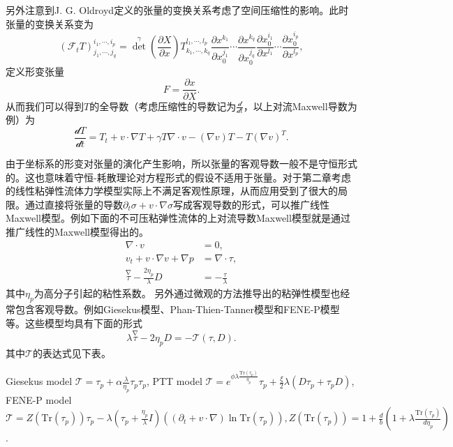 \documentclass{article}
\begin{document}
另外注意到J. G. Oldroyd定义的张量的变换关系考虑了空间压缩性的影响。此时张量的变换关系变为
\begin{equation*}
	(\mathcal{F}_t T)^{i_1,\cdots,i_p}_{j_1, \cdots,j_q} = {\det}^\gamma({\frac{\partial X}{\partial x}}) T^{l_1,\cdots,l_p}_{k_1, \cdots,k_q} \frac{\partial x^{k_1}}{\partial x_0^{j_1}} \cdots \frac{\partial x^{k_q}}{\partial x_0^{j_q}} \frac{\partial x_0^{i_1}}{\partial x^{l_1}} \cdots \frac{\partial x_0^{i_p}}{\partial x^{l_p}},  
\end{equation*}
定义形变张量
\begin{equation*}
	F = \frac{\partial x}{\partial X}.
\end{equation*}
从而我们可以得到$T$的全导数（考虑压缩性的导数记为$\frac{\mathcal{d}}{\mathcal{d} t}$，以上对流Maxwell导数为例）为
\begin{equation*}
	\frac{\mathcal{d} T}{\mathcal{d} t} =  T_t +v \cdot \nabla T + \gamma T \nabla \cdot v - (\nabla v) T - T(\nabla v)^T.   
\end{equation*}

由于坐标系的形变对张量的演化产生影响，所以张量的客观导数一般不是守恒形式的。这也意味着守恒-耗散理论对方程形式的假设不适用于张量。对于第二章考虑的线性粘弹性流体力学模型实际上不满足客观性原理，从而应用受到了很大的局限。通过直接将张量的导数$\partial_t \sigma  + v \cdot \nabla \sigma$写成客观导数的形式，可以推广线性Maxwell模型。例如下面的不可压粘弹性流体的上对流导数Maxwell模型就是通过推广线性的Maxwell模型得出的\cite{}。
\begin{subequations} \label{eq:UCM}
	\begin{align}
		\nabla \cdot v &= 0, \\
		v_t + v \cdot \nabla v + \nabla p  &= \nabla \cdot \tau, \\
		\stackrel{\nabla} \tau - \frac{2\eta_p}{\lambda} D &= - \frac{\tau}{\lambda}
	\end{align}
\end{subequations}
其中$\eta_p$为高分子引起的粘性系数。
另外通过微观的方法推导出的粘弹性模型也经常包含客观导数。例如Giesekus模型、Phan-Thien-Tanner模型和FENE-P模型等。这些模型均具有下面的形式
\begin{equation*}
	\lambda \stackrel{\nabla} \tau  -2 \eta_p D = - \mathcal{T}(\tau,D).
\end{equation*}
其中$\mathcal{T}$的表达式见下表\cite{}。

Giesekus model $\mathcal{T} = \tau_p + \alpha \frac{\lambda}{\eta_p} \tau_p\tau_p$,
PTT model $\mathcal{T} = e^{\phi \lambda \frac{\mbox{Tr}(\tau_p)}{\eta_p}}\tau_p + \frac{\xi}{2} \lambda (D \tau_p + \tau_p D)$,
FENE-P model $\mathcal{T}  = Z(\mbox{Tr}(\tau_p))\tau_p  -\lambda (\tau_p + \frac{\eta_p}{\lambda} I)\left( (\partial_t + v \cdot \nabla) \ln \mbox{Tr}(\tau_p) \right), Z(\mbox{Tr}(\tau_p)) = 1 + \frac{d}{b} (1+ \lambda \frac{\mbox{Tr}{(\tau_p)}}{d \eta_p})$.
\end{document}
